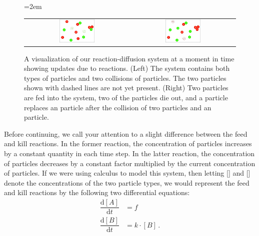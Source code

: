 \begin{figure}[h]
\centering
\mySfFamily
\tabcolsep=2em
\begin{tabular}{c c}
\includegraphics[width=0.35\textwidth]{../images_CMYK/reaction-diffusion_three_reactions_before} & \includegraphics[width=0.35\textwidth]{../images_CMYK/reaction-diffusion_three_reactions_after}\\
\end{tabular}
\caption{A visualization of our reaction-diffusion system at a moment in time showing updates due to reactions. (Left) The system contains both types of particles and two collisions of particles. The two  particles shown with dashed lines are not yet present.  (Right) Two  particles are fed into the system, two of the  particles die out, and a  particle replaces an  particle after the collision of two  particles and an  particle.}
\label{fig:three_reactions}
\end{figure}

Before continuing, we call your attention to a slight difference between the feed and kill reactions. In the former reaction, the concentration of  particles increases by a constant quantity in each time step. In the latter reaction, the concentration of  particles decreases by a constant factor multiplied by the current concentration of  particles. If we were using calculus to model this system, then letting [] and [] denote the concentrations of the two particle types, we would represent the feed and kill reactions by the following two differential equations:
\begin{align*}
\dfrac{\mathrm{d}[A]}{\mathrm{d}t} & = f\\[1ex]
\dfrac{\mathrm{d}[B]}{\mathrm{d}t} & = k \cdot [B]\,.
\end{align*}

